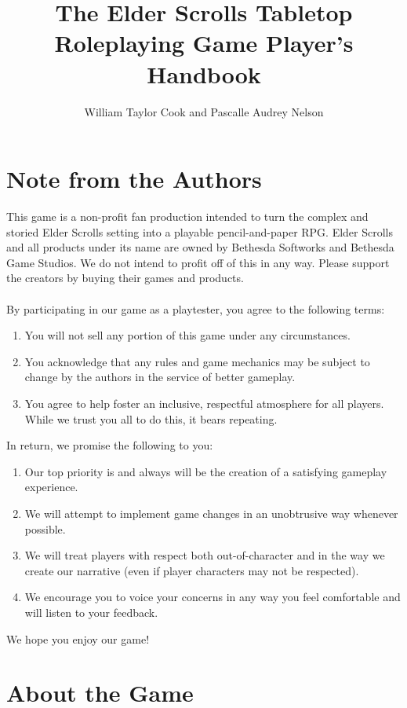 \documentclass[12pt]{book}
\title{The Elder Scrolls Tabletop Roleplaying Game Player's Handbook}
\author{William Taylor Cook and Pascalle Audrey Nelson}
\begin{document}
\maketitle

\section*{Note from the Authors}
This game is a non-profit fan production intended to turn the complex and storied Elder Scrolls setting into a playable pencil-and-paper RPG. Elder Scrolls and all products under its name are owned by Bethesda Softworks and Bethesda Game Studios. We do not intend to profit off of this in any way. Please support the creators by buying their games and products.\\~\\
By participating in our game as a playtester, you agree to the following terms:

\begin{enumerate}
	\item You will not sell any portion of this game under any circumstances.
	\item You acknowledge that any rules and game mechanics may be subject to change by the authors in the service of better gameplay.
	\item You agree to help foster an inclusive, respectful atmosphere for all players. While we trust you all to do this, it bears repeating.
\end{enumerate}
In return, we promise the following to you:

\begin{enumerate}
	\item Our top priority is and always will be the creation of a satisfying gameplay experience.
	\item We will attempt to implement game changes in an unobtrusive way whenever possible.
	\item We will treat players with respect both out-of-character and in the way we create our narrative (even if player characters may not be respected).
	\item We encourage you to voice your concerns in any way you feel comfortable and will listen to your feedback.
\end{enumerate}
We hope you enjoy our game!
\newpage

\section*{About the Game}
\end{document}
